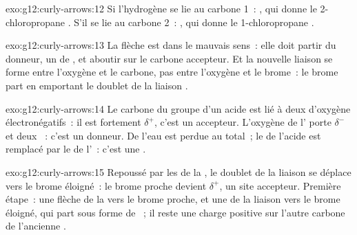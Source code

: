 \begin{solution}{exo:g12:curly-arrows:12}
Si l'hydrogène se lie au carbone 1~: , qui donne le
2-chloropropane . S'il se lie au carbone 2~:
, qui donne le 1-chloropropane .
\end{solution}

\begin{solution}{exo:g12:curly-arrows:13}
La flèche est dans le mauvais sens~: elle doit partir du donneur, un
 de , et aboutir sur le carbone accepteur. Et
la nouvelle liaison se forme entre l'oxygène et le carbone, pas entre
l'oxygène et le brome~: le brome part en emportant le doublet de la
liaison .
\end{solution}

\begin{solution}{exo:g12:curly-arrows:14}
Le carbone du groupe  d'un acide est lié à deux 
d'oxygène électronégatifs~: il est fortement $\delta^+$, c'est un
accepteur. L'oxygène de l' porte $\delta^-$ et deux ~: c'est un donneur. De l'eau est perdue au total~; le  de
l'acide est remplacé par le  de l'~: c'est une
.
\end{solution}

\begin{solution}{exo:g12:curly-arrows:15}
Repoussé par les  de la , le doublet de la
liaison  se déplace vers le brome éloigné~: le brome proche
devient $\delta^+$, un site accepteur. Première étape~: une flèche de la
 vers le brome proche, et une de la liaison 
vers le brome éloigné, qui part sous forme de ~; il reste une
charge positive sur l'autre carbone de l'ancienne .
\end{solution}

